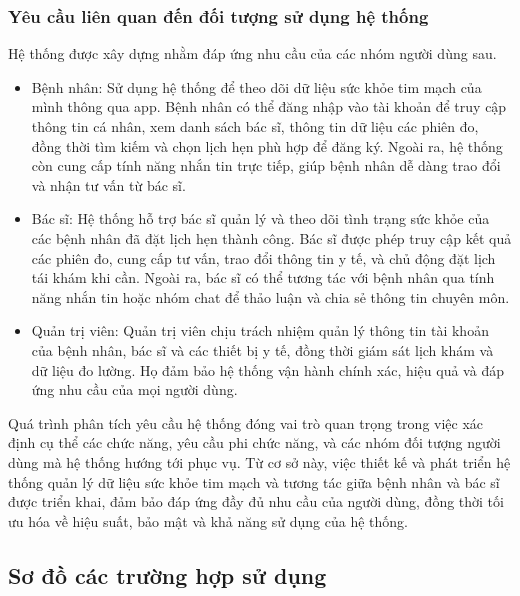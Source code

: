 \subsubsection{Yêu cầu liên quan đến đối tượng sử dụng hệ thống}
Hệ thống được xây dựng nhằm đáp ứng nhu cầu của các nhóm người dùng sau.
\begin{adjustwidth}{1.5em}{}
	\begin{itemize}
		\item Bệnh nhân: Sử dụng hệ thống để theo dõi dữ liệu sức khỏe tim mạch của mình thông qua app.
		      Bệnh nhân có thể đăng nhập vào tài khoản để truy cập thông tin cá nhân, xem danh sách bác sĩ, thông tin dữ liệu các phiên đo, đồng thời tìm kiếm và chọn lịch hẹn phù hợp để đăng ký.
		      Ngoài ra, hệ thống còn cung cấp tính năng nhắn tin trực tiếp, giúp bệnh nhân dễ dàng trao đổi và nhận tư vấn từ bác sĩ.

		\item Bác sĩ: Hệ thống hỗ trợ bác sĩ quản lý và theo dõi tình trạng sức khỏe của các bệnh nhân đã đặt lịch hẹn thành công.
		      Bác sĩ được phép truy cập kết quả các phiên đo, cung cấp tư vấn, trao đổi thông tin y tế, và chủ động đặt lịch tái khám khi cần.
		      Ngoài ra, bác sĩ có thể tương tác với bệnh nhân qua tính năng nhắn tin hoặc nhóm chat để thảo luận và chia sẻ thông tin chuyên môn.

		\item Quản trị viên: Quản trị viên chịu trách nhiệm quản lý thông tin tài khoản của bệnh nhân, bác sĩ và các thiết bị y tế, đồng thời giám sát lịch khám và dữ liệu đo lường.
		      Họ đảm bảo hệ thống vận hành chính xác, hiệu quả và đáp ứng nhu cầu của mọi người dùng.
	\end{itemize}
\end{adjustwidth}

Quá trình phân tích yêu cầu hệ thống đóng vai trò quan trọng trong việc xác định cụ thể các chức năng, yêu cầu phi chức năng, và các nhóm đối tượng người dùng mà hệ thống hướng tới phục vụ.
Từ cơ sở này, việc thiết kế và phát triển hệ thống quản lý dữ liệu sức khỏe tim mạch và tương tác giữa bệnh nhân và bác sĩ được triển khai, đảm bảo đáp ứng đầy đủ nhu cầu của người dùng,
đồng thời tối ưu hóa về hiệu suất, bảo mật và khả năng sử dụng của hệ thống.


\subsection{Sơ đồ các trường hợp sử dụng}

